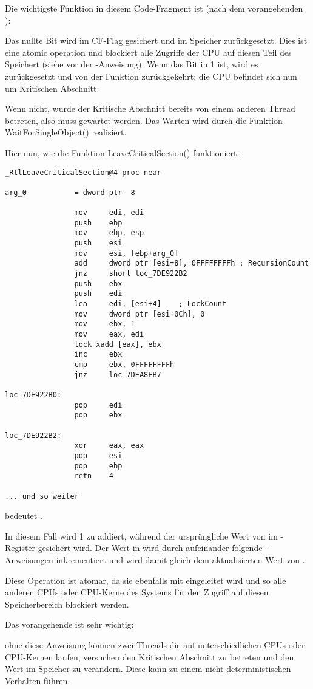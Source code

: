 
Die wichtigste Funktion in diesem Code-Fragment ist  (nach dem vorangehenden ):

Das nullte Bit wird im CF-Flag gesichert und im Speicher zurückgesetzt.
Dies ist eine \gls{atomic operation} und blockiert alle Zugriffe der CPU auf diesen
Teil des Speichert (siehe  vor der -Anweisung).
Wenn das Bit in  1 ist, wird es zurückgesetzt und von der Funktion
zurückgekehrt: die CPU befindet sich nun um Kritischen Abschnitt.

Wenn nicht, wurde der Kritische Abschnitt bereits von einem anderen Thread betreten,
also muss gewartet werden.
Das Warten wird durch die Funktion WaitForSingleObject() realisiert.

Hier nun, wie die Funktion LeaveCriticalSection() funktioniert:

\begin{lstlisting}[caption=Windows 2008/ntdll.dll/x86 (begin),style=customasmx86]
_RtlLeaveCriticalSection@4 proc near

arg_0           = dword ptr  8

                mov     edi, edi
                push    ebp
                mov     ebp, esp
                push    esi
                mov     esi, [ebp+arg_0]
                add     dword ptr [esi+8], 0FFFFFFFFh ; RecursionCount
                jnz     short loc_7DE922B2
                push    ebx
                push    edi
                lea     edi, [esi+4]    ; LockCount
                mov     dword ptr [esi+0Ch], 0
                mov     ebx, 1
                mov     eax, edi
                lock xadd [eax], ebx
                inc     ebx
                cmp     ebx, 0FFFFFFFFh
                jnz     loc_7DEA8EB7

loc_7DE922B0:
                pop     edi
                pop     ebx

loc_7DE922B2:
                xor     eax, eax
                pop     esi
                pop     ebp
                retn    4

... und so weiter
\end{lstlisting}

 bedeutet .

In diesem Fall wird 1 zu  addiert, während der ursprüngliche Wert von 
im -Register gesichert wird.
Der Wert in  wird durch aufeinander folgende -Anweisungen inkrementiert und
wird damit gleich dem aktualisierten Wert von .

Diese Operation ist atomar, da sie ebenfalls mit  eingeleitet wird und so alle anderen
CPUs oder CPU-Kerne des Systems für den Zugriff auf diesen Speicherbereich blockiert werden.

Das vorangehende  ist sehr wichtig:

ohne diese Anweisung können zwei Threads die auf unterschiedlichen CPUs oder CPU-Kernen laufen,
versuchen den Kritischen Abschnitt zu betreten und den Wert im Speicher zu verändern.
Diese kann zu einem nicht-deterministischen Verhalten führen.

